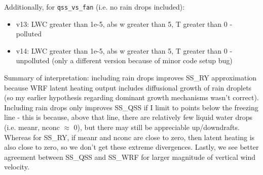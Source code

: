 \documentclass{article}
\begin{document}
\begin{itemize}
\begin{itemize}
	\end{itemize}
	\noindent Additionally, for \texttt{qss\_vs\_fan} (i.e. no rain drops included):
	\begin{itemize}
		\item v13: LWC greater than 1e-5, abs w greater than 5, T greater than 0 - polluted
		\item v14: LWC greater than 1e-5, abs w greater than 5, T greater than 0 - unpolluted (only a different version because of minor code setup bug)
	\end{itemize}
	\noindent Summary of interpretation: including rain drops improves SS\_RY approximation because WRF latent heating output includes diffusional growth of rain droplets (so my earlier hypothesis regarding dominant growth mechanisms wasn't correct). Including rain drops only improves SS\_QSS if I limit to points below the freezing line - this is because, above that line, there are relatively few liquid water drops (i.e. meanr, nconc $\approx$ 0), but there may still be appreciable up/downdrafts. Whereas for SS\_RY, if meanr and nconc are close to zero, then latent heating is also close to zero, so we don't get these extreme divergences. Lastly, we see better agreement between SS\_QSS and SS\_WRF for larger magnitude of vertical wind velocity.\\


\end{itemize}
\end{document}
